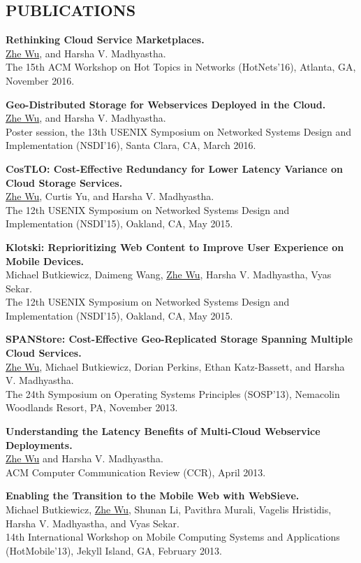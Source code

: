 \documentclass[zhemargin]{res}
\begin{document}
\begin{resume}
\section{\small PUBLICATIONS}
    \textbf{Rethinking Cloud Service Marketplaces.}\\
    \underline{Zhe Wu}, and Harsha V. Madhyastha.\\
    The 15th ACM Workshop on Hot Topics in Networks (HotNets'16), Atlanta, GA, November 2016.

    \textbf{Geo-Distributed Storage for Webservices Deployed in the Cloud.}\\
    \underline{Zhe Wu}, and Harsha V. Madhyastha.\\
    Poster session, the 13th USENIX Symposium on Networked Systems Design and Implementation (NSDI'16), Santa Clara, CA, March 2016.

    \textbf{CosTLO: Cost-Effective Redundancy for Lower Latency Variance on Cloud Storage Services.} \\
    \underline{Zhe Wu}, Curtis Yu, and Harsha V. Madhyastha.\\
    The 12th USENIX Symposium on Networked Systems Design and Implementation (NSDI'15), Oakland, CA, May 2015.

    \textbf{Klotski: Reprioritizing Web Content to Improve User Experience on Mobile Devices.} \\
    Michael Butkiewicz, Daimeng Wang, \underline{Zhe Wu}, Harsha V. Madhyastha, Vyas Sekar.\\
    The 12th USENIX Symposium on Networked Systems Design and Implementation (NSDI'15), Oakland, CA, May 2015.

	\textbf{SPANStore: Cost-Effective Geo-Replicated Storage Spanning Multiple Cloud Services.} \\
	\underline{Zhe Wu}, Michael Butkiewicz, Dorian Perkins, Ethan Katz-Bassett, and Harsha V. Madhyastha.\\
	The 24th Symposium on Operating Systems Principles (SOSP'13), Nemacolin Woodlands Resort, PA, November 2013.

	\textbf{Understanding the Latency Benefits of Multi-Cloud Webservice Deployments.} \\
	\underline{Zhe Wu} and Harsha V. Madhyastha.\\
	ACM Computer Communication Review (CCR), April 2013.

\clearpage

	\textbf{Enabling the Transition to the Mobile Web with WebSieve.} \\
	Michael Butkiewicz, \underline{Zhe Wu}, Shunan Li, Pavithra Murali, Vagelis Hristidis, Harsha V. Madhyastha, and Vyas Sekar. \\
	14th International Workshop on Mobile Computing Systems and Applications (HotMobile'13), Jekyll Island, GA, February 2013.


\end{resume}
\end{document}
